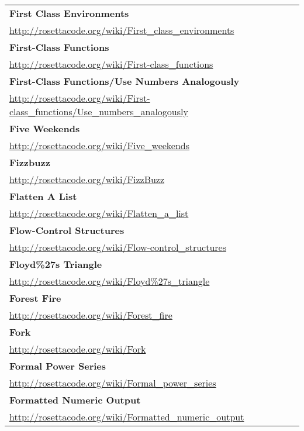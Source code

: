 \begin{longtable}{l}
\textbf{
First Class Environments } \\ \href{http://rosettacode.org/wiki/First\_class\_environments}{http://rosettacode.org/wiki/First\_class\_environments} \\
\textbf{First-Class Functions } \\ \href{http://rosettacode.org/wiki/First-class\_functions}{http://rosettacode.org/wiki/First-class\_functions} \\
\textbf{
First-Class Functions/Use Numbers Analogously } \\ \href{http://rosettacode.org/wiki/First-class\_functions/Use\_numbers\_analogously}{http://rosettacode.org/wiki/First-class\_functions/Use\_numbers\_analogously} \\
\textbf{Five Weekends } \\ \href{http://rosettacode.org/wiki/Five\_weekends}{http://rosettacode.org/wiki/Five\_weekends} \\
\textbf{
Fizzbuzz } \\ \href{http://rosettacode.org/wiki/FizzBuzz}{http://rosettacode.org/wiki/FizzBuzz} \\
\textbf{Flatten A List } \\ \href{http://rosettacode.org/wiki/Flatten\_a\_list}{http://rosettacode.org/wiki/Flatten\_a\_list} \\
\textbf{Flow-Control Structures } \\ \href{http://rosettacode.org/wiki/Flow-control\_structures}{http://rosettacode.org/wiki/Flow-control\_structures} \\
\textbf{
Floyd\%27s Triangle } \\ \href{http://rosettacode.org/wiki/Floyd\%27s\_triangle}{http://rosettacode.org/wiki/Floyd\%27s\_triangle} \\
\textbf{Forest Fire } \\ \href{http://rosettacode.org/wiki/Forest\_fire}{http://rosettacode.org/wiki/Forest\_fire} \\
\textbf{Fork } \\ \href{http://rosettacode.org/wiki/Fork}{http://rosettacode.org/wiki/Fork} \\
\textbf{Formal Power Series } \\ \href{http://rosettacode.org/wiki/Formal\_power\_series}{http://rosettacode.org/wiki/Formal\_power\_series} \\
\textbf{
Formatted Numeric Output } \\ \href{http://rosettacode.org/wiki/Formatted\_numeric\_output}{http://rosettacode.org/wiki/Formatted\_numeric\_output} \\

\end{longtable}
